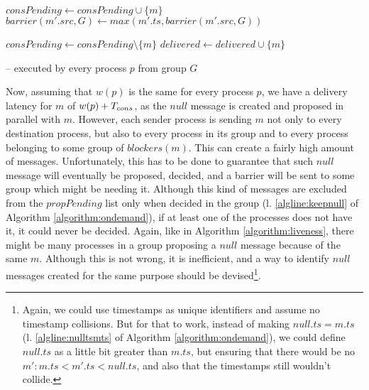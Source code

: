 \documentclass[times, 10pt]{article}
\begin{document}
\begin{algorithm}
\begin{distribalgo}[1]
\blankline
{}  
    \STATE $consPending \leftarrow consPending \cup \{m\}$
  \ENDIF
  \STATE $barrier(m'.src,G) \leftarrow max(m'.ts, barrier(m'.src,G))$  
\ENDINDENT

\blankline
{}
  \STATE $consPending \leftarrow consPending \setminus \{m\}$
  \STATE {}
  \STATE $delivered \leftarrow delivered \cup \{m\}$

\blankline
\ENDINDENT

\caption{ -- executed by every process $p$ from group $G$}
\label{algorithm:ondemand}
\end{distribalgo}
\end{algorithm}

Now, assuming that $w(p)$ is the same for every process $p$, we have a delivery latency for $m$ of $w(p) + T_{cons}$, as the $null$ message is created and proposed in parallel with $m$. However, each sender process is sending $m$ not only to every destination process, but also to every process in its group and to every process belonging to some group of $blockers(m)$. This can create a fairly high amount of messages. Unfortunately, this has to be done to guarantee that such $null$ message will eventually be proposed, decided, and a barrier will be sent to some group which might be needing it. Although this kind of messages are excluded from the $propPending$ list only when decided in the group (l. \ref{algline:keepnull} of Algorithm \ref{algorithm:ondemand}), if at least one of the processes does not have it, it could never be decided. Again, like in Algorithm \ref{algorithm:liveness}, there might be many processes in a group proposing a $null$ message because of the same $m$. Although this is not wrong, it is inefficient, and a way to identify $null$ messages created for the same purpose should be devised\footnote{Again, we could use timestamps as unique identifiers and assume no timestamp collisions. But for that to work, instead of making $null.ts = m.ts$ (l. \ref{algline:nulltsmts} of Algorithm \ref{algorithm:ondemand}), we could define $null.ts$ as a little bit greater than $m.ts$, but ensuring that there would be no $m' : m.ts < m'.ts < null.ts$, and also that the timestamps still wouldn't collide.}.
\end{document}

